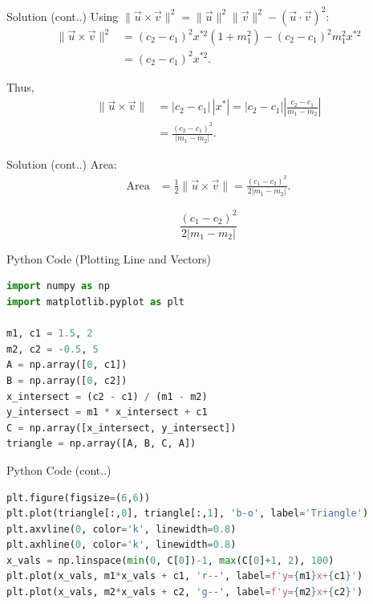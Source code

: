 \documentclass{beamer}
\begin{document}
\begin{frame}{Solution (cont..)}
Using $\|\vec{u} \times \vec{v}\|^2 = \|\vec{u}\|^2 \|\vec{v}\|^2 - (\vec{u} \cdot \vec{v})^2$:
\begin{align}
\|\vec{u} \times \vec{v}\|^2 &= (c_2-c_1)^2 x^{*2}(1+m_1^2) - (c_2-c_1)^2 m_1^2 x^{*2} \\
&= (c_2-c_1)^2 x^{*2}.
\end{align}

Thus,
\begin{align}
\|\vec{u} \times \vec{v}\| &= |c_2-c_1|\,|x^*| = |c_2-c_1| \left| \frac{c_2-c_1}{m_1-m_2} \right| \\
&= \frac{(c_2-c_1)^2}{|m_1-m_2|}.
\end{align}
\end{frame}

\begin{frame}{Solution (cont..)}
Area:
\begin{align}
\text{Area} &= \tfrac{1}{2} \|\vec{u} \times \vec{v}\| = \frac{(c_1-c_2)^2}{2|m_1-m_2|}.
\end{align}

\[
\boxed{\frac{(c_1-c_2)^2}{2|m_1-m_2|}}
\]
\end{frame}

\begin{frame}[fragile]{Python Code (Plotting Line and Vectors)}
\begin{lstlisting}[language=Python]
import numpy as np
import matplotlib.pyplot as plt

m1, c1 = 1.5, 2 
m2, c2 = -0.5, 5     
A = np.array([0, c1])
B = np.array([0, c2])
x_intersect = (c2 - c1) / (m1 - m2)
y_intersect = m1 * x_intersect + c1
C = np.array([x_intersect, y_intersect])
triangle = np.array([A, B, C, A]) 
\end{lstlisting}
\end{frame}

\begin{frame}[fragile]{Python Code (cont..)}
\begin{lstlisting}[language=Python]
plt.figure(figsize=(6,6))
plt.plot(triangle[:,0], triangle[:,1], 'b-o', label='Triangle')
plt.axvline(0, color='k', linewidth=0.8) 
plt.axhline(0, color='k', linewidth=0.8) 
x_vals = np.linspace(min(0, C[0])-1, max(C[0]+1, 2), 100)
plt.plot(x_vals, m1*x_vals + c1, 'r--', label=f'y={m1}x+{c1}')
plt.plot(x_vals, m2*x_vals + c2, 'g--', label=f'y={m2}x+{c2}')
\end{lstlisting}
\end{frame}
\end{document}
